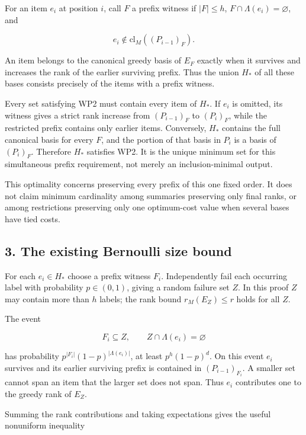 For an item \(e_i\) at position \(i\), call \(F\) a prefix witness if \(|F|\le h\), \(F\cap\Lambda(e_i)=\varnothing\), and

\[
e_i\notin\mathrm{cl}_M((P_{i-1})_F).
\tag{WP5}
\]

An item belongs to the canonical greedy basis of \(E_F\) exactly when it survives and increases the rank of the earlier surviving prefix. Thus the union \(H_*\) of all these bases consists precisely of the items with a prefix witness.

Every set satisfying WP2 must contain every item of \(H_*\). If \(e_i\) is omitted, its witness gives a strict rank increase from \((P_{i-1})_F\) to \((P_i)_F\), while the restricted prefix contains only earlier items. Conversely, \(H_*\) contains the full canonical basis for every \(F\), and the portion of that basis in \(P_i\) is a basis of \((P_i)_F\). Therefore \(H_*\) satisfies WP2. It is the unique minimum set for this simultaneous prefix requirement, not merely an inclusion-minimal output.

This optimality concerns preserving every prefix of this one fixed order. It does not claim minimum cardinality among summaries preserving only final ranks, or among restrictions preserving only one optimum-cost value when several bases have tied costs.

\hypertarget{af-eb38c0014f-the-existing-bernoulli-size-bound}{%
\subsection{3. The existing Bernoulli size bound}\label{af-eb38c0014f-the-existing-bernoulli-size-bound}}

For each \(e_i\in H_*\) choose a prefix witness \(F_i\). Independently fail each occurring label with probability \(p\in(0,1)\), giving a random failure set \(Z\). In this proof \(Z\) may contain more than \(h\) labels; the rank bound \(r_M(E_Z)\le r\) holds for all \(Z\).

The event

\[
F_i\subseteq Z,
\qquad Z\cap\Lambda(e_i)=\varnothing
\tag{WP6}
\]

has probability \(p^{|F_i|}(1-p)^{|\Lambda(e_i)|}\), at least \(p^h(1-p)^d\). On this event \(e_i\) survives and its earlier surviving prefix is contained in \((P_{i-1})_{F_i}\). A smaller set cannot span an item that the larger set does not span. Thus \(e_i\) contributes one to the greedy rank of \(E_Z\).

Summing the rank contributions and taking expectations gives the useful nonuniform inequality


